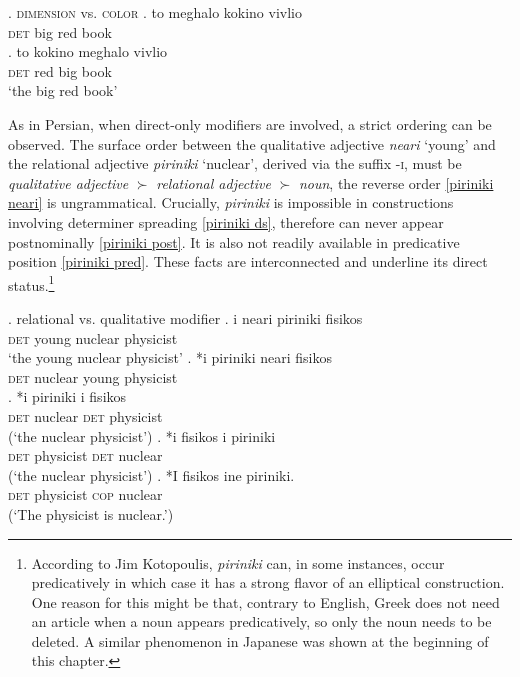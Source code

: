 \documentclass [output=book,colorlinks,citecolor=brown]{langscibook}
\begin{document}
\ex. \textsc{dimension} vs. \textsc{color} 
\ag. to meghalo kokino vivlio\\
\textsc{det} big red book\\
\bg. to kokino meghalo vivlio\\
\textsc{det} red big book\\
`the big red book’

As in Persian, when direct-only modifiers are involved, a strict ordering can be observed. The surface order between the qualitative adjective \textit{neari} `young' and the relational adjective \textit{piriniki} `nuclear’, derived via the suffix -\textsc{i}, must be \textit{qualitative adjective} $\succ$ \textit{relational adjective} $\succ$ \textit{noun}, the reverse order \ref{piriniki neari} is ungrammatical. Crucially, \textit{piriniki} is impossible in constructions involving determiner spreading \ref{piriniki ds}, therefore can never appear postnominally \ref{piriniki post}. It is also not readily available in predicative position \ref{piriniki pred}. These facts are interconnected and underline its direct status.\footnote{According to Jim Kotopoulis, \textit{piriniki} can, in some instances, occur predicatively in which case it has a strong flavor of an elliptical construction. One reason for this might be that, contrary to English, Greek does not need an article when a noun appears predicatively, so only the noun needs to be deleted. A similar phenomenon in Japanese was shown at the beginning of this chapter.} %


\ex. relational vs. qualitative modifier
\ag. i neari piriniki fisikos\\
\textsc{det} young nuclear physicist\\
`the young nuclear physicist'
\bg. *i piriniki neari fisikos\\
\textsc{det} nuclear young physicist \label{piriniki neari}\\
\cg. *i piriniki i fisikos\\
\textsc{det} nuclear \textsc{det} physicist \label{piriniki ds}\\
(`the nuclear physicist’)
\dg. *i fisikos i piriniki\\
\textsc{det} physicist \textsc{det} nuclear \label{piriniki post}\\
(`the nuclear physicist’)
\eg. *I fisikos ine piriniki.\\
\textsc{det} physicist \textsc{cop} nuclear\\
(`The physicist is nuclear.’) \label{piriniki pred}
\end{document}
